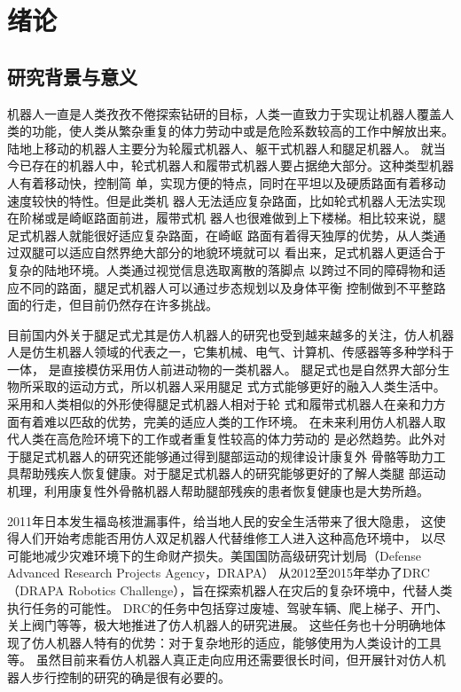 \newcommand{\aref}[1]{\autoref{#1}\space}
\renewcommand{\algorithmcfname}{算法}
\chapter{绪论}
\section{研究背景与意义}
机器人一直是人类孜孜不倦探索钻研的目标，人类一直致力于实现让机器人覆盖人
类的功能，使人类从繁杂重复的体力劳动中或是危险系数较高的工作中解放出来。
陆地上移动的机器人主要分为轮履式机器人、躯干式机器人和腿足机器人。
就当今已存在的机器人中，轮式机器人和履带式机器人要占据绝大部分。这种类型机器人有着移动快，控制简
单，实现方便的特点，同时在平坦以及硬质路面有着移动速度较快的特性。但是此类机
器人无法适应复杂路面，比如轮式机器人无法实现在阶梯或是崎岖路面前进，履带式机
器人也很难做到上下楼梯。相比较来说，腿足式机器人就能很好适应复杂路面，在崎岖
路面有着得天独厚的优势，从人类通过双腿可以适应自然界绝大部分的地貌环境就可以
看出来，足式机器人更适合于复杂的陆地环境\cite{Schraft2000ServiceR}。人类通过视觉信息选取离散的落脚点
以跨过不同的障碍物和适应不同的路面，腿足式机器人可以通过步态规划以及身体平衡
控制做到不平整路面的行走，但目前仍然存在许多挑战。

目前国内外关于腿足式尤其是仿人机器人的研究也受到越来越多的关注，仿人机器
人是仿生机器人领域的代表之一，它集机械、电气、计算机、传感器等多种学科于一体，
是直接模仿采用仿人前进动物的一类机器人\cite{梶田秀司2007仿人机器人}。
腿足式也是自然界大部分生物所采取的运动方式，所以机器人采用腿足
式方式能够更好的融入人类生活中。采用和人类相似的外形使得腿足式机器人相对于轮
式和履带式机器人在亲和力方面有着难以匹敌的优势，完美的适应人类的工作环境\cite{2010067776.nh}。
在未来利用仿人机器人取代人类在高危险环境下的工作或者重复性较高的体力劳动的
是必然趋势。此外对于腿足式机器人的研究还能够通过得到腿部运动的规律设计康复外
骨骼等助力工具帮助残疾人恢复健康。对于腿足式机器人的研究能够更好的了解人类腿
部运动机理，利用康复性外骨骼机器人帮助腿部残疾的患者恢复健康也是大势所趋。

2011年日本发生福岛核泄漏事件，给当地人民的安全生活带来了很大隐患，
这使得人们开始考虑能否用仿人双足机器人代替维修工人进入这种高危环境中，
以尽可能地减少灾难环境下的生命财产损失。美国国防高级研究计划局（Defense Advanced Research Projects Agency，DRAPA）
从2012至2015年举办了DRC（DRAPA Robotics Challenge），旨在探索机器人在灾后的复杂环境中，代替人类执行任务的可能性。
DRC的任务中包括穿过废墟、驾驶车辆、爬上梯子、开门、关上阀门等等，极大地推进了仿人机器人的研究进展。
这些任务也十分明确地体现了仿人机器人特有的优势：对于复杂地形的适应，能够使用为人类设计的工具等。
虽然目前来看仿人机器人真正走向应用还需要很长时间，但开展针对仿人机器人步行控制的研究的确是很有必要的。
